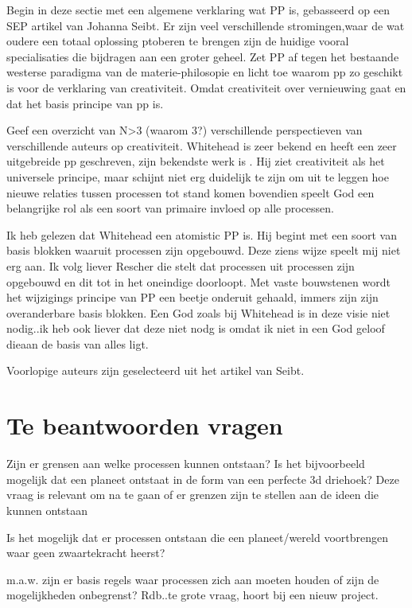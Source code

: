 \documentclass[a4paper]{Thesis}
\begin{document}
Begin in deze sectie met een algemene verklaring wat PP is, gebasseerd op een SEP artikel van Johanna Seibt. Er zijn veel verschillende stromingen,waar de wat oudere een totaal oplossing ptoberen te brengen zijn de huidige vooral specialisaties die bijdragen aan een groter geheel.
Zet PP af tegen het bestaande westerse paradigma van de materie-philosopie en licht toe waarom pp zo geschikt is voor de verklaring van creativiteit. Omdat creativiteit over vernieuwing gaat en dat het basis principe van pp is.

Geef een overzicht van N>3 (waarom 3?) verschillende perspectieven van verschillende auteurs op creativiteit. Whitehead is zeer bekend en heeft een zeer uitgebreide pp geschreven, zijn bekendste werk is \cite{whitehead1929process}. Hij ziet creativiteit als het universele principe, maar schijnt niet erg duidelijk te zijn om uit te leggen hoe nieuwe relaties tussen processen tot stand komen bovendien speelt God een belangrijke rol als een soort van primaire invloed op alle processen.

Ik heb gelezen dat Whitehead een atomistic PP is. Hij begint met een soort van basis blokken waaruit processen zijn opgebouwd. Deze ziens wijze speelt mij niet erg aan. Ik volg liever Rescher die stelt dat processen uit processen zijn opgebouwd en dit tot in het oneindige doorloopt. Met vaste bouwstenen wordt het wijzigings principe van PP een beetje onderuit gehaald, immers zijn zijn overanderbare basis blokken. Een God zoals bij Whitehead is in deze visie niet nodig..ik heb ook liever dat deze niet nodg is omdat ik niet in een God geloof dieaan de basis van alles ligt.

Voorlopige auteurs zijn geselecteerd uit het artikel van Seibt.

\section{Te beantwoorden vragen}
Zijn er grensen aan welke processen kunnen ontstaan? Is het bijvoorbeeld mogelijk dat een planeet ontstaat in de form van een perfecte 3d driehoek?
Deze vraag is relevant om na te gaan of er grenzen zijn te stellen aan de ideen die kunnen ontstaan

Is het mogelijk dat er processen ontstaan die een planeet/wereld voortbrengen waar geen zwaartekracht heerst?

m.a.w. zijn er basis regels waar processen zich aan moeten houden of zijn de mogelijkheden onbegrenst? 
Rdb..te grote vraag, hoort bij een nieuw project.
\end{document}
